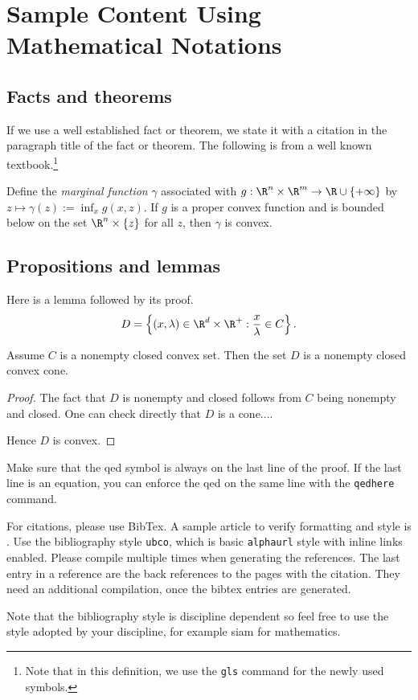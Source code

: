 \chapter{Sample Content Using Mathematical Notations}

\section{Facts and theorems}

If we use a well established fact or theorem, we state
it with a citation in the paragraph title of the fact or theorem. The
following is from a well known textbook.\footnote{Note that in this
  definition, we use the \texttt{gls} command for the newly used
  symbols.}

\begin{fact}\cite[Theorem~IV.2.4.2]{Hiriart-Urruty:1993-ConvexAnalysis}\label{def:marginalfunc}
  Define the \emph{marginal function} $\gamma$ associated with
  $g:\R^n\times\R^m\rightarrow \R\cup \{+\infty\}$ by
  $z\mapsto \gamma(z):=\inf_x g(x,z)$. If $g$ is a proper convex
  function and is bounded below on the set $\R^n \times \{z\}$ for all
  $z$, then $\gamma$ is convex.
\end{fact}

\section{Propositions and lemmas}

Here is a lemma followed by its proof.
\[
D =\left\{ (x,\lambda)\in \R^d \times \R^+ : \frac{x}{\lambda} \in C\right\}.
\]

\begin{lemma}
  Assume $C$ is a nonempty closed convex set. Then the set $D$ is a
  nonempty closed convex cone.
\end{lemma}

\begin{proof}
  The fact that $D$ is nonempty and closed follows from $C$ being
  non\-empty and closed. One can check directly that $D$ is a cone....

Hence $D$ is convex.
\end{proof}
Make sure that the qed symbol is always on the last line of the
proof. If the last line is an equation, you can enforce the qed on the
same line with the \texttt{qedhere} command.

For citations, please use BibTex. A sample article to verify
formatting and style is \cite{Bauschke:2007-PA02}. Use the
bibliography style \texttt{ubco}, which is basic \texttt{alphaurl}
style with inline links enabled. Please compile multiple times when
generating the references. The last entry in a reference are the back
references to the pages with the citation. They need an additional
compilation, once the bibtex entries are generated.

Note that the bibliography style is discipline dependent so feel free
to use the style adopted by your discipline, for example siam for
mathematics.
